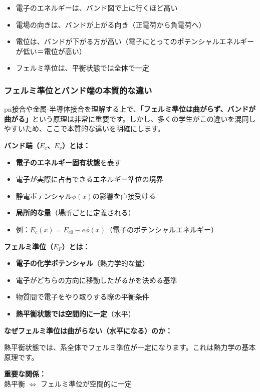 \begin{itemize}
\item 電子のエネルギーは、バンド図で上に行くほど高い
\item 電場の向きは、バンドが上がる向き（正電荷から負電荷へ）
\item 電位は、バンドが下がる方が高い（電子にとってのポテンシャルエネルギーが低い＝電位が高い）
\item フェルミ準位は、平衡状態では全体で一定
\end{itemize}

\subsubsection{フェルミ準位とバンド端の本質的な違い}

pn接合や金属-半導体接合を理解する上で、\textbf{「フェルミ準位は曲がらず、バンドが曲がる」}という原理は非常に重要です。しかし、多くの学生がこの違いを混同しやすいため、ここで本質的な違いを明確にします。

\textbf{バンド端（$E_c$、$E_v$）とは：}

\begin{itemize}
\item \textbf{電子のエネルギー固有状態}を表す
\item 電子が実際に占有できるエネルギー準位の境界
\item 静電ポテンシャル$\phi(x)$の影響を直接受ける
\item \textbf{局所的な量}（場所ごとに定義される）
\item 例：$E_c(x) = E_{c0} - e\phi(x)$（電子のポテンシャルエネルギー）
\end{itemize}

\textbf{フェルミ準位（$E_F$）とは：}

\begin{itemize}
\item \textbf{電子の化学ポテンシャル}（熱力学的な量）
\item 電子がどちらの方向に移動したがるかを決める基準
\item 物質間で電子をやり取りする際の平衡条件
\item \textbf{熱平衡状態では空間的に一定}（水平）
\end{itemize}

\textbf{なぜフェルミ準位は曲がらない（水平になる）のか：}

熱平衡状態では、系全体でフェルミ準位が一定になります。これは熱力学の基本原理です。

\begin{screen}
\textbf{重要な関係：}\\
熱平衡 $\Leftrightarrow$ フェルミ準位が空間的に一定
\end{screen}

